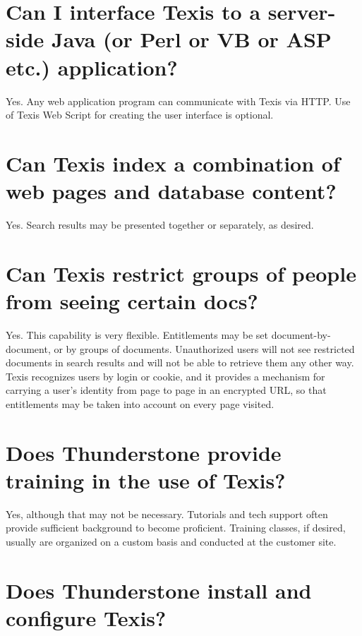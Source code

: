 \section{Can I interface Texis to a server-side Java (or Perl or VB or ASP etc.) application? }

Yes.  Any web application program can communicate with Texis via HTTP.
Use of Texis Web Script for creating the user interface is optional.

\section{Can Texis index a combination of web pages and database content? }

Yes.  Search results may be presented together or separately, as
desired.

\section{Can Texis restrict groups of people from seeing certain docs?}

Yes.  This capability is very flexible.  Entitlements may be set
document-by-document, or by groups of documents. Unauthorized users
will not see restricted documents in search results and will not be
able to retrieve them any other way.  Texis recognizes users by login
or cookie, and it provides a mechanism for carrying a user's identity
from page to page in an encrypted URL, so that entitlements may be
taken into account on every page visited.

\section{Does Thunderstone provide training in the use of Texis? }

Yes, although that may not be necessary.  Tutorials and tech support
often provide sufficient background to become proficient.  Training
classes, if desired, usually are organized on a custom basis and
conducted at the customer site.

\section{Does Thunderstone install and configure Texis? }


